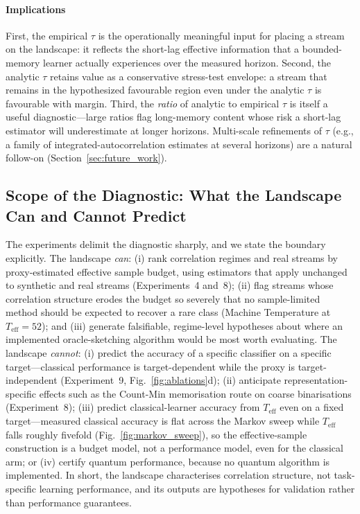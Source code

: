 \documentclass[sensors,article,submit,pdftex,moreauthors]{Definitions/mdpi}
\newcommand{\Teff}{T_{\mathrm{eff}}}
\begin{document}
\paragraph{Implications} First, the empirical $\tau$ is the operationally meaningful input for placing a stream on the landscape: it reflects the short-lag effective information that a bounded-memory learner actually experiences over the measured horizon. Second, the analytic $\tau$ retains value as a conservative stress-test envelope: a stream that remains in the hypothesized favourable region even under the analytic $\tau$ is favourable with margin. Third, the \emph{ratio} of analytic to empirical $\tau$ is itself a useful diagnostic---large ratios flag long-memory content whose risk a short-lag estimator will underestimate at longer horizons. Multi-scale refinements of $\tau$ (e.g., a family of integrated-autocorrelation estimates at several horizons) are a natural follow-on (Section~\ref{sec:future_work}).

\subsection{Scope of the Diagnostic: What the Landscape Can and Cannot Predict}
\label{sec:scope_diag}

The experiments delimit the diagnostic sharply, and we state the boundary explicitly. The landscape \emph{can}: (i) rank correlation regimes and real streams by proxy-estimated effective sample budget, using estimators that apply unchanged to synthetic and real streams (Experiments~4 and~8); (ii) flag streams whose correlation structure erodes the budget so severely that no sample-limited method should be expected to recover a rare class (Machine Temperature at $\Teff = 52$); and (iii) generate falsifiable, regime-level hypotheses about where an implemented oracle-sketching algorithm would be most worth evaluating. The landscape \emph{cannot}: (i) predict the accuracy of a specific classifier on a specific target---classical performance is target-dependent while the proxy is target-independent (Experiment~9, Fig.~\ref{fig:ablations}d); (ii) anticipate representation-specific effects such as the Count-Min memorisation route on coarse binarisations (Experiment~8); (iii) predict classical-learner accuracy from $\Teff$ even on a fixed target---measured classical accuracy is flat across the Markov sweep while $\Teff$ falls roughly fivefold (Fig.~\ref{fig:markov_sweep}), so the effective-sample construction is a budget model, not a performance model, even for the classical arm; or (iv) certify quantum performance, because no quantum algorithm is implemented. In short, the landscape characterises correlation structure, not task-specific learning performance, and its outputs are hypotheses for validation rather than performance guarantees.
\end{document}
